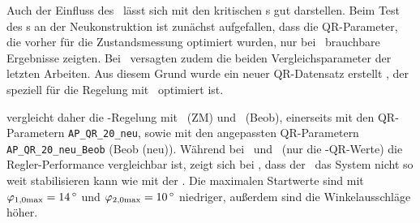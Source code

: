 Auch der Einfluss des \beob\ lässt sich mit den kritischen \xots s gut darstellen.
Beim Test des \beob s an der Neukonstruktion ist zunächst aufgefallen, dass die QR-Parameter, die vorher für die Zustandsmessung optimiert wurden, nur bei \apz\ brauchbare Ergebnisse zeigten.
Bei \apv\ versagten zudem die beiden Vergleichsparameter der letzten Arbeiten.
Aus diesem Grund wurde ein neuer QR-Datensatz erstellt , der speziell für die Regelung mit \beob\ optimiert ist.

 vergleicht daher die \ap-Regelung mit \zm\ (ZM) und \beob\ (Beob), einerseits mit den QR-Parametern \texttt{AP\_QR\_20\_neu}, sowie mit den angepassten QR-Parametern \texttt{AP\_QR\_20\_neu\_Beob} (Beob (neu)).
Während bei \apz\ und \apd\ (nur die \beob-QR-Werte) die Regler-Performance vergleichbar ist, zeigt sich bei \apv, dass der \beob\ das System nicht so weit stabilisieren kann wie mit der \zm. 
Die maximalen Startwerte sind mit $\varphi_{1,0\mrm{max}}=\valdeg{14}$ und $\varphi_{2,0\mrm{max}}=\valdeg{10}$ niedriger, außerdem sind die Winkelausschläge höher.

